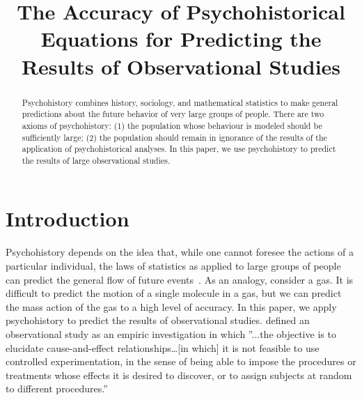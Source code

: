 \documentclass{obs}
\begin{document}
\begin{frontmatter}
\title{The Accuracy of Psychohistorical Equations for Predicting the Results of Observational Studies}

\begin{aug}
\author{ }
\address{Department of Psychohistory\\
       Streeling University\\
       Trantor, Center of the Galaxy 94830, Galactic Empire}
\author{ }
\address{Department of Physics\\
       Pacific Tech\\
       Los Angeles, CA 90001, USA}
\end{aug}


\begin{abstract}
Psychohistory combines history, sociology, and mathematical statistics to make general predictions about the future behavior 
of very large groups of people. There are two axioms of psychohistory: (1) the population whose behaviour is modeled 
should be sufficiently large; (2) the population should remain in ignorance of the results of the application 
of psychohistorical analyses.  In this paper, we use psychohistory to predict the results of large observational studies.
\end{abstract}

\begin{keyword}
\end{keyword}
\end{frontmatter}

\section{Introduction}

Psychohistory depends on the idea that, while one cannot foresee the actions of a particular individual, the laws of statistics as applied to large groups of people can predict the general flow of future events~\citep{Breiman2001Statistical}.  As an analogy, consider a gas.  It is difficult to predict the motion of a single molecule in a gas, but we can predict the mass action of the gas to a high level of accuracy.  In this paper, we apply psychohistory to predict the results of observational studies.  \citet{Hastie2009Elements} defined an observational study as an empiric investigation in which ''...the objective is to elucidate cause-and-effect relationships…[in which] it is not feasible to use controlled experimentation, in the sense of being able to impose the procedures or treatments whose effects it is desired to discover, or to assign subjects at random to different procedures.''
\end{document}
